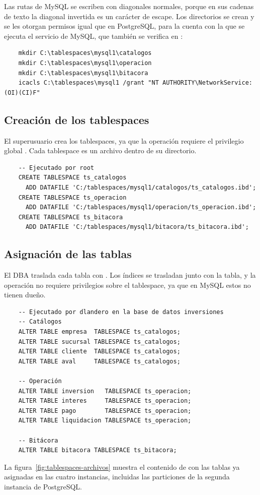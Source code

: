 Las rutas de MySQL se escriben con diagonales normales, porque en sus cadenas de texto la diagonal invertida es un carácter de escape. Los directorios se crean y se les otorgan permisos igual que en PostgreSQL, para la cuenta con la que se ejecuta el servicio de MySQL, que también se verifica en :

\begin{verbatim}
	mkdir C:\tablespaces\mysql1\catalogos
	mkdir C:\tablespaces\mysql1\operacion
	mkdir C:\tablespaces\mysql1\bitacora
	icacls C:\tablespaces\mysql1 /grant "NT AUTHORITY\NetworkService:(OI)(CI)F"
\end{verbatim}

\subsection{Creaci\'on de los tablespaces}

El superusuario crea los tablespaces, ya que la operación requiere el privilegio global . Cada tablespace es un archivo  dentro de su directorio.

\begin{verbatim}
	-- Ejecutado por root
	CREATE TABLESPACE ts_catalogos
	  ADD DATAFILE 'C:/tablespaces/mysql1/catalogos/ts_catalogos.ibd';
	CREATE TABLESPACE ts_operacion
	  ADD DATAFILE 'C:/tablespaces/mysql1/operacion/ts_operacion.ibd';
	CREATE TABLESPACE ts_bitacora
	  ADD DATAFILE 'C:/tablespaces/mysql1/bitacora/ts_bitacora.ibd';
\end{verbatim}

\subsection{Asignaci\'on de las tablas}

El DBA traslada cada tabla con . Los índices se trasladan junto con la tabla, y la operación no requiere privilegios sobre el tablespace, ya que en MySQL estos no tienen dueño.

\begin{verbatim}
	-- Ejecutado por dlandero en la base de datos inversiones
	-- Catálogos
	ALTER TABLE empresa  TABLESPACE ts_catalogos;
	ALTER TABLE sucursal TABLESPACE ts_catalogos;
	ALTER TABLE cliente  TABLESPACE ts_catalogos;
	ALTER TABLE aval     TABLESPACE ts_catalogos;

	-- Operación
	ALTER TABLE inversion   TABLESPACE ts_operacion;
	ALTER TABLE interes     TABLESPACE ts_operacion;
	ALTER TABLE pago        TABLESPACE ts_operacion;
	ALTER TABLE liquidacion TABLESPACE ts_operacion;

	-- Bitácora
	ALTER TABLE bitacora TABLESPACE ts_bitacora;
\end{verbatim}

La figura~\ref{fig:tablespaces-archivos} muestra el contenido de  con las tablas ya asignadas en las cuatro instancias, incluidas las particiones de la segunda instancia de PostgreSQL.

